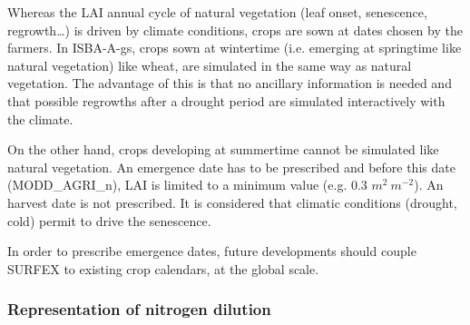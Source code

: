 {Whereas the LAI annual cycle of natural vegetation (leaf onset, senescence, regrowth…) is driven by
climate conditions, crops are sown at dates chosen by the farmers. In ISBA-A-gs, crops sown at
wintertime (i.e. emerging at springtime like natural vegetation) like wheat, are simulated in the same
way as natural vegetation. The advantage of this is that no ancillary information is needed and that
possible regrowths after a drought period are simulated interactively with the climate.

On the other hand, crops developing at summertime cannot be simulated like natural vegetation. An
emergence date has to be prescribed and before this date (MODD\_AGRI\_n), LAI is limited to a
minimum value (e.g. 0.3 $m^{2} ~m^{-2}$). An harvest date is not prescribed. It is considered that climatic
conditions (drought, cold) permit to drive the senescence.

In order to prescribe emergence dates, future developments should couple SURFEX to existing crop
calendars, at the global scale.

\subsubsection{Representation of nitrogen dilution}
\label{sec3.6}

}
